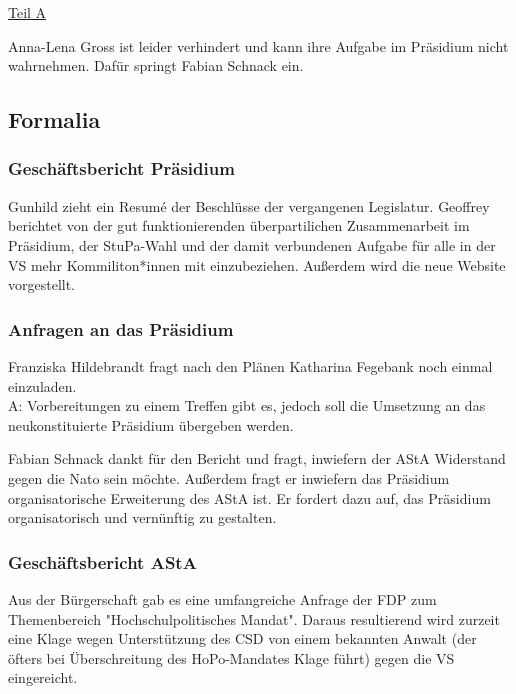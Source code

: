 \documentclass[ngerman,headheight=70pt]{scrartcl}
\begin{document}
    \newpage

    {\Large \underline{Teil A}}

    Anna-Lena Gross ist leider verhindert und kann ihre Aufgabe im Präsidium
    nicht wahrnehmen. Dafür springt Fabian Schnack ein.

    \subsection{Formalia}

    \subsubsection{Geschäftsbericht Präsidium}

    Gunhild zieht ein Resumé der Beschlüsse der vergangenen Legislatur.
    Geoffrey berichtet von der gut funktionierenden überpartilichen
    Zusammenarbeit im Präsidium, der StuPa-Wahl und der damit verbundenen
    Aufgabe für alle in der VS mehr Kommiliton*innen mit einzubeziehen.
    Außerdem wird die neue Website vorgestellt.

    \subsubsection{Anfragen an das Präsidium}

        Franziska Hildebrandt fragt nach den Plänen Katharina Fegebank
        noch einmal einzuladen.\\
        A: Vorbereitungen zu einem Treffen gibt es, jedoch soll die Umsetzung an
        das neukonstituierte Präsidium übergeben werden.

        Fabian Schnack dankt für den Bericht und fragt, inwiefern der AStA
        Widerstand gegen die Nato sein möchte. Außerdem fragt er inwiefern
        das Präsidium organisatorische Erweiterung des AStA ist. Er fordert
        dazu auf, das Präsidium organisatorisch und vernünftig zu gestalten.

    \subsubsection{Geschäftsbericht AStA}

    Aus der Bürgerschaft gab es eine umfangreiche Anfrage der FDP zum
    Themenbereich "Hochschulpolitisches Mandat". Daraus resultierend wird
    zurzeit eine Klage wegen Unterstützung des CSD von einem bekannten Anwalt
    (der öfters bei Überschreitung des HoPo-Mandates Klage führt) gegen die VS
    eingereicht.
\end{document}
